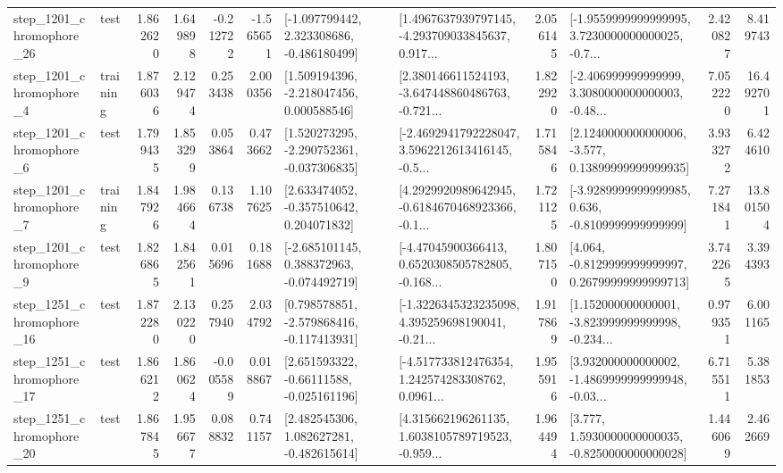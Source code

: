 \begin{tabular}{llrrrrllrlrr}
 step\_1201\_chromophore\_26 &      test &      1.862620 &    1.649898 &     -0.212722 & -1.565651 &   [-1.097799442, 2.323308686, -0.486180499] &  [1.4967637939797145, -4.293709033845637, 0.917... &       2.056145 &  [-1.9559999999999995, 3.7230000000000025, -0.7... &            2.420827 &          8.419743 \\
  step\_1201\_chromophore\_4 &  training &      1.876036 &    2.129474 &      0.253438 &  2.000356 &    [1.509194396, -2.218047456, 0.000588546] &  [2.380146611524193, -3.647448860486763, -0.721... &       1.822920 &  [-2.406999999999999, 3.3080000000000003, -0.48... &            7.052220 &         16.492701 \\
  step\_1201\_chromophore\_6 &      test &      1.799435 &    1.853299 &      0.053864 &  0.473662 &   [1.520273295, -2.290752361, -0.037306835] &  [-2.4692941792228047, 3.5962212613416145, -0.5... &       1.715846 &  [2.1240000000000006, -3.577, 0.13899999999999935] &            3.933272 &          6.424610 \\
  step\_1201\_chromophore\_7 &  training &      1.847926 &    1.984664 &      0.136738 &  1.107625 &    [2.633474052, -0.357510642, 0.204071832] &  [4.2929920989642945, -0.6184670468923366, -0.1... &       1.721125 &  [-3.9289999999999985, 0.636, -0.8109999999999999] &            7.271841 &         13.801504 \\
  step\_1201\_chromophore\_9 &      test &      1.826865 &    1.842561 &      0.015696 &  0.181688 &   [-2.685101145, 0.388372963, -0.074492719] &  [-4.47045900366413, 0.6520308505782805, -0.168... &       1.807150 &  [4.064, -0.8129999999999997, 0.26799999999999713] &            3.742265 &          3.394393 \\
 step\_1251\_chromophore\_16 &      test &      1.872280 &    2.130220 &      0.257940 &  2.034792 &   [0.798578851, -2.579868416, -0.117413931] &  [-1.3226345323235098, 4.395259698190041, -0.21... &       1.917869 &  [1.152000000000001, -3.823999999999998, -0.234... &            0.979351 &          6.001165 \\
 step\_1251\_chromophore\_17 &      test &      1.866212 &    1.860624 &     -0.005589 &  0.018867 &    [2.651593322, -0.66111588, -0.025161196] &  [-4.517733812476354, 1.242574283308762, 0.0961... &       1.955916 &  [3.932000000000002, -1.4869999999999948, -0.03... &            6.715511 &          5.381853 \\
 step\_1251\_chromophore\_20 &      test &      1.867845 &    1.956677 &      0.088832 &  0.741157 &    [2.482545306, 1.082627281, -0.482615614] &  [4.315662196261135, 1.6038105789719523, -0.959... &       1.964494 &   [3.777, 1.5930000000000035, -0.8250000000000028] &            1.446069 &          2.462669 \\

\end{tabular}

